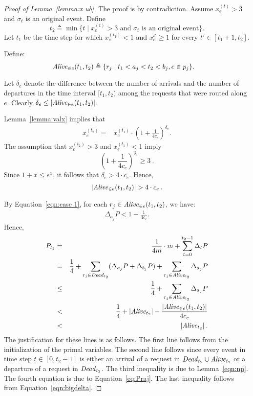 \documentclass[11pt]{article}
\newenvironment{proof sketch}[1]{\noindent {\emph{Proof sketch of #1:}}}{\hfill \qed}
\newcommand{\eqdf}{\triangleq}
\newcommand{\valp}{P}
\newcommand{\PR}{\Delta_t P}
\newcommand{\PRaj}{\Delta_{a_j} P}
\newcommand{\PRbj}{\Delta_{b_j} P}
\newcommand{\alive}{\text{\textit{Alive}}}
\newcommand{\dead}{\text{\textit{Dead}}}
\begin{document}
\begin{proof}[Proof of Lemma~\ref{lemma:x ub}]
  The proof is by contradiction.  Assume $x_e^{(t)}>3$ and $\sigma_t$ is an original event. Define
\[
t_2 \eqdf \min\{t \mid
x_e^{(t)} >3 \text{ and $\sigma_t$ is an original event}\}.
\]
Let $t_1$ be the time step for which $x_e^{(t_1)}<1$ and $x_e^{t'}
\geq 1$ for every $t'\in [t_1+1,t_2]$.

Define:
\begin{align*}
\alive_{\in e}(t_1,t_2) &\eqdf \{r_j \mid t_1 <  a_j < t_2 < b_j, e \in p_j\}.
\end{align*}

Let $\delta_e$ denote
the difference between the number of arrivals and the number of
departures in the time interval $[t_1,t_2)$ among the requests that
were routed along $e$.
Clearly $\delta_e \leq |\alive_{\in e}(t_1,t_2)|$.

    Lemma~\ref{lemma:valx} implies that
    \begin{align}
      x_e^{(t_2)} =& x_e^{(t_1)}\cdot \left(1+
        \frac{1}{4c_e}\right)^{\delta_e}. \nonumber \label{eqn:gneq2}
    \end{align}
The assumption that $x_e^{(t_2)} >3$ and
$x_e^{(t_1)}<1$ imply
      \[
        \left(1+\frac{1}{4c_e}\right)^{\delta_e} \geq 3\:.
      \]
Since  $1+x \leq e^x$, it follows that $\delta_e > 4\cdot c_e$.
Hence,
    \begin{align}
       |\alive_{\in e}(t_1,t_2)| > 4\cdot c_e \label{eqn:bigdelta}\:.
    \end{align}


By Equation~\ref{eqn:case 1},
for each $r_j\in \alive_{\in e}(t_1,t_2)$, we have:
\begin{align}\label{eq:Praj}
  \PRaj<1-\frac{1}{4c_e}.
\end{align}
Hence,
    \begin{eqnarray}
        \valp_{t_2} & = & \frac {1}{4m}\cdot m + \sum_{t=0}^{t_2-1} \PR  \nonumber\\
        & = & \frac 14+ \sum_{r_j \in \dead_{t_2}}( \PRaj +\PRbj) + \sum_{r_j \in \alive_{t_2}} \PRaj \nonumber\\
        & \leq & \frac 14+  \sum_{r_j \in \alive_{t_2}} \PRaj \nonumber\\
        & < & \frac 14+
        |\alive_{t_2}|
-
        \frac{|\alive_{\in e}(t_1,t_2)| }{4c_e}
\nonumber\\
& < &|\alive_{t_2}| \label{eqn: finaly}\:.
    \end{eqnarray}
    The justification for these lines is as follows.
    The first line follows from the initialization of the primal variables.
    The second line follows since every event in time step $t\in[0,t_2-1]$ is either
an arrival of a request in $\dead_{t_2}\cup \alive_{t_2}$ or a departure of a request in $\dead_{t_2}$.
    The third inequality is due to Lemma~\ref{eqn:np}.
    The fourth equation is due to Equation~\ref{eq:Praj}.
    The last inequality follows from Equation~\ref{eqn:bigdelta}.


\end{proof}
\end{document}
